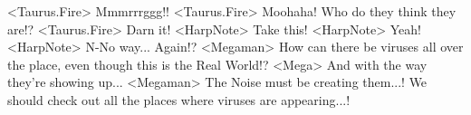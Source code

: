 <Taurus.Fire> Mmmrrrggg!! 
<Taurus.Fire> Moohaha! Who do they think they are!? 
<Taurus.Fire> Darn it! 
<HarpNote> Take this! 
<HarpNote> Yeah! 
<HarpNote> N-No way... Again!? 
<Megaman> How can there be viruses all over the place, even though this is the Real World!? 
<Mega> And with the way they're showing up... 
<Megaman> The Noise must be creating them...! 
We should check out all the places where viruses are appearing...! 
